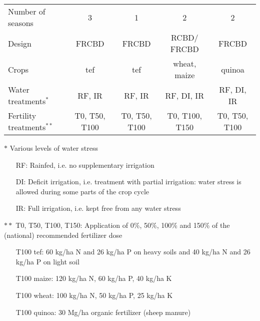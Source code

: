 \begin{landscape}
\begin{table}[htbp]
{\begin{threeparttable}
\begin{tabular}{lrrrc}
Number of seasons & \multicolumn{1}{c}{3} & \multicolumn{1}{c}{1} & \multicolumn{1}{c}{2} & 2 \\
Design & \multicolumn{1}{c}{FRCBD} & \multicolumn{1}{c}{FRCBD} & \multicolumn{1}{c}{RCBD/ FRCBD} & FRCBD \\
Crops & \multicolumn{1}{c}{tef} & \multicolumn{1}{c}{tef} & \multicolumn{1}{c}{wheat, maize} & quinoa \\
Water treatments$^{*}$ & \multicolumn{1}{c}{RF, IR} & \multicolumn{1}{c}{RF, IR} & \multicolumn{1}{c}{RF, DI, IR} & RF, DI, IR \\
Fertility treatments$^{**}$ & \multicolumn{1}{c}{T0, T50, T100} & \multicolumn{1}{c}{T0, T50, T100} & \multicolumn{1}{c}{T0, T100, T150} & T0, T50, T100 \\
\bottomrule				
    	\end{tabular}%
    	\begin{tablenotes}
        \tiny{
      	\item[$\ast$] Various levels of water stress
      	\begin{itemize}
          \item[] RF: Rainfed, i.e. no supplementary irrigation
      	  \item[] DI: Deficit irrigation, i.e. treatment with partial irrigation: water stress is allowed during some parts of the crop cycle  
          \item[] IR: Full irrigation, i.e. kept free from any water stress   	
		\end{itemize}
		\item[$\ast\ast$] T0, T50, T100, T150: Application of 0\%, 50\%, 100\% and 150\% of the (national) recommended fertilizer dose 
		\begin{itemize}
        \item[] T100 tef: 60 kg/ha N and 26 kg/ha P on heavy soils and 40 kg/ha N and 26 kg/ha P on light soil  \parencite{earo2002}
		\item[] T100 maize: 120 kg/ha N, 60 kg/ha P, 40 kg/ha K \parencite{moac2010} 
		\item[] T100 wheat: 100 kg/ha N, 50 kg/ha P, 25 kg/ha K \parencite{moac2010} 
		\item[] T100 quinoa: 30 Mg/ha organic fertilizer (sheep manure) \parencite{miranda2012a}
		\end{itemize} 
		} 
    	\end{tablenotes}
        \end{threeparttable}
              }
  \label{tab:ch3_metExp}%
\end{table}%
\end{landscape}

